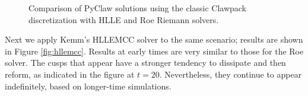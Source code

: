 \documentclass{article}
\begin{document}
\begin{figure}
\begin{centering}
  \end{centering}
  \caption{
    Comparison of PyClaw solutions using the classic Clawpack discretization
    with HLLE and Roe Riemann solvers.\label{fig:hlle_vs_roe}}
\end{figure}

Next we apply Kemm's HLLEMCC solver to the same scenario; results are shown
in Figure \ref{fig:hllemcc}.  Results at early times are very similar to
those for the Roe solver.  The cusps that appear have a stronger tendency
to dissipate and then reform, as indicated in the figure at $t=20$.
Nevertheless, they continue to appear indefinitely, based on longer-time
simulations.
\end{document}
